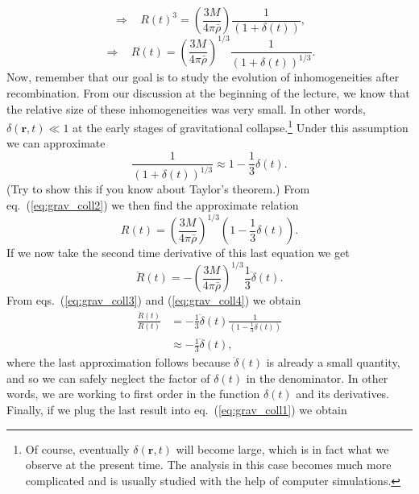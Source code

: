 \documentclass[11pt, a4paper,oneside,openright]{book}
\numberwithin{equation}{section}
\begin{document}
\begin{equation}
\Rightarrow~~~~ R(t)^3=\left(\frac{3M}{4\pi\bar{\rho}}\right)\frac{1}{\left(1+\delta(t)\right)},
\end{equation}
\begin{equation} \label{eq:grav_coll2}
\Rightarrow~~~~ R(t)=\left(\frac{3M}{4\pi\bar{\rho}}\right)^{1/3}\frac{1}{\left(1+\delta(t)\right)^{1/3}}.
\end{equation}
Now, remember that our goal is to study the evolution of inhomogeneities after recombination. From our discussion at the beginning of the lecture, we know that the relative size of these inhomogeneities was very small. In other words, $\delta(\mathbf{r},t)\ll1$ at the early stages of gravitational collapse.\footnote{Of course, eventually $\delta(\mathbf{r},t)$ will become large, which is in fact what we observe at the present time. The analysis in this case becomes much more complicated and is usually studied with the help of computer simulations.} Under this assumption we can approximate
\begin{equation}
\frac{1}{\left(1+\delta(t)\right)^{1/3}}\approx 1-\frac{1}{3}\delta(t).
\end{equation}
(Try to show this if you know about Taylor's theorem.) From eq.\ (\ref{eq:grav_coll2}) we then find the approximate relation
\begin{equation} \label{eq:grav_coll3}
R(t)=\left(\frac{3M}{4\pi\bar{\rho}}\right)^{1/3}\left(1-\frac{1}{3}\delta(t)\right).
\end{equation}
If we now take the second time derivative of this last equation we get
\begin{equation} \label{eq:grav_coll4}
\ddot{R}(t)=-\left(\frac{3M}{4\pi\bar{\rho}}\right)^{1/3}\frac{1}{3}\ddot{\delta}(t).
\end{equation}
From eqs.\ (\ref{eq:grav_coll3}) and (\ref{eq:grav_coll4}) we obtain
\begin{equation}
\begin{split}
\frac{\ddot{R}(t)}{R(t)}&=-\frac{1}{3}\ddot{\delta}(t)\frac{1}{\left(1-\frac{1}{3}\delta(t)\right)}\\
&\approx -\frac{1}{3}\ddot{\delta}(t),
\end{split}
\end{equation}
where the last approximation follows because $\ddot{\delta}(t)$ is already a small quantity, and so we can safely neglect the factor of $\delta(t)$ in the denominator. In other words, we are working to first order in the function $\delta(t)$ and its derivatives. Finally, if we plug the last result into eq.\ (\ref{eq:grav_coll1}) we obtain
\end{document}
